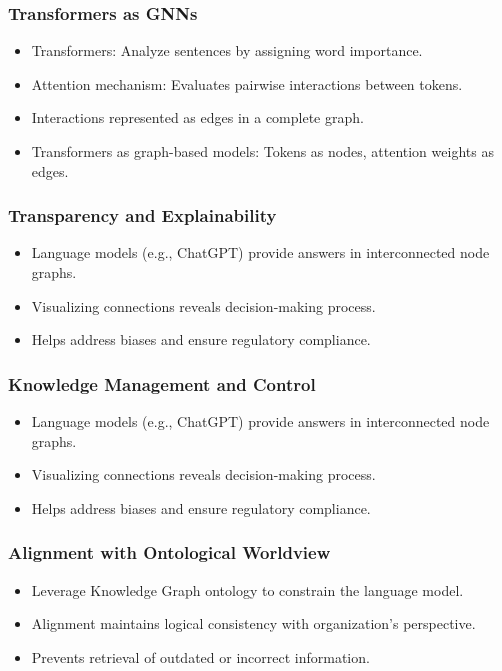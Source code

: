 \begin{frame}[fragile]\frametitle{Transformers as GNNs}

\begin{itemize}
\item Transformers: Analyze sentences by assigning word importance.
\item Attention mechanism: Evaluates pairwise interactions between tokens.
\item Interactions represented as edges in a complete graph.
\item Transformers as graph-based models: Tokens as nodes, attention weights as edges.
\end{itemize}
	  
\end{frame}


\begin{frame}[fragile]\frametitle{Transparency and Explainability}

\begin{itemize}
\item Language models (e.g., ChatGPT) provide answers in interconnected node graphs.
\item Visualizing connections reveals decision-making process.
\item Helps address biases and ensure regulatory compliance.
\end{itemize}
	  
\end{frame}

\begin{frame}[fragile]\frametitle{Knowledge Management and Control}

\begin{itemize}
\item Language models (e.g., ChatGPT) provide answers in interconnected node graphs.
\item Visualizing connections reveals decision-making process.
\item Helps address biases and ensure regulatory compliance.
\end{itemize}
	  
\end{frame}

\begin{frame}[fragile]\frametitle{Alignment with Ontological Worldview}

\begin{itemize}
\item Leverage Knowledge Graph ontology to constrain the language model.
\item Alignment maintains logical consistency with organization's perspective.
\item Prevents retrieval of outdated or incorrect information.
\end{itemize}
	  
\end{frame}

